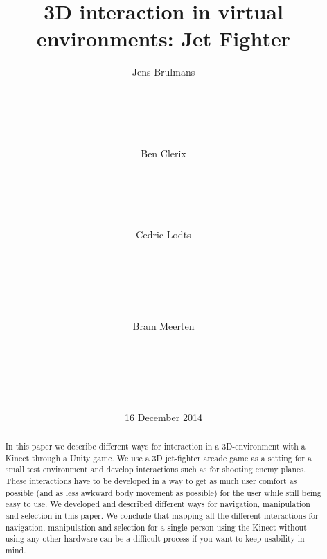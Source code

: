 \documentclass{acm_proc_article-sp}
\begin{document}
\title{3D interaction in virtual environments: Jet Fighter}

%
%
\author{
    \alignauthor Jens Brulmans\\
    \\
    \\
    \\
    \\
    \\
    \alignauthor Ben Clerix\\
    \\
    \\
    \\
    \\
    \\
    \alignauthor Cedric Lodts\\
    \\
    \\
    \\
    \\
    \\
    \and
    \alignauthor Bram Meerten\\
    \\
    \\
    \\
    \\
    \\
}

\date{16 December 2014}

\maketitle
\begin{abstract}
In this paper we describe different ways for interaction in a 3D-environment with a Kinect through a Unity game. We use a 3D jet-fighter arcade game as a setting for a small test environment and develop interactions such as for shooting enemy planes.
These interactions have to be developed in a way to get as much user comfort as possible (and as less awkward body movement as possible) for the user while still being easy to use. We developed and described different ways for navigation, manipulation and selection in this paper.
We conclude that mapping all the different interactions for navigation, manipulation and selection for a single person using the Kinect without using any other hardware can be a difficult process if you want to keep usability in mind.
\end{abstract}
\end{document}
